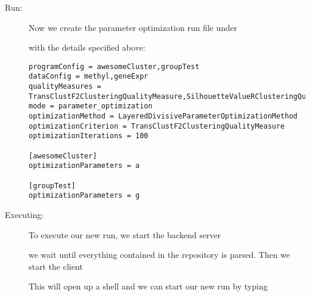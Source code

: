 \begin{description}
	\item[Run:] Now we create the parameter optimization run file under
	
		
	 with the details specified above:
\begin{lstlisting}
programConfig = awesomeCluster,groupTest
dataConfig = methyl,geneExpr
qualityMeasures = TransClustF2ClusteringQualityMeasure,SilhouetteValueRClusteringQualityMeasure,SensitivityClusteringQualityMeasure
mode = parameter_optimization
optimizationMethod = LayeredDivisiveParameterOptimizationMethod
optimizationCriterion = TransClustF2ClusteringQualityMeasure
optimizationIterations = 100

[awesomeCluster]
optimizationParameters = a

[groupTest]
optimizationParameters = g
	\end{lstlisting}
	\item[Executing:] To execute our new run, we start the backend server
	
	
	we wait until everything contained in the repository is parsed. Then we start the client
	
	
	This will open up a shell and we can start our new run by typing
	
\end{description}	
